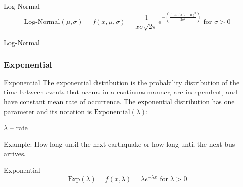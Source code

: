 \begin{frame}[noframenumbering]{Log-Normal}
	$$\text{Log-Normal}(\mu,\sigma) = f(x, \mu, \sigma) = \frac{1}{x \sigma{\sqrt{2\pi}}}e^{-\left({\frac {(\ln(x)-\mu)^2}{2 \sigma^2 }}\right)} \text{ for $\sigma > 0$}$$
\end{frame}

\begin{frame}[noframenumbering]{Log-Normal}
	\centering
\end{frame}

\subsubsection*{Exponential}
\begin{frame}[noframenumbering]{Exponential}
	The exponential distribution is the probability distribution of the time
	between events that occurs in a continuos manner, are independent,
	and have constant mean rate of occurrence.
	\vfill
	The exponential distribution has one parameter and its notation is
	$\text{Exponential}(\lambda)$:
	\begin{vfilleditems}
		\item $\lambda$ -- rate
	\end{vfilleditems}
	\vfill
	Example: How long until the next earthquake or how long until the next bus arrives.
\end{frame}

\begin{frame}[noframenumbering]{Exponential}
	$$\text{Exp}(\lambda) = f(x, \lambda) = \lambda e^{-\lambda x} \text{ for $\lambda > 0$}$$
\end{frame}

